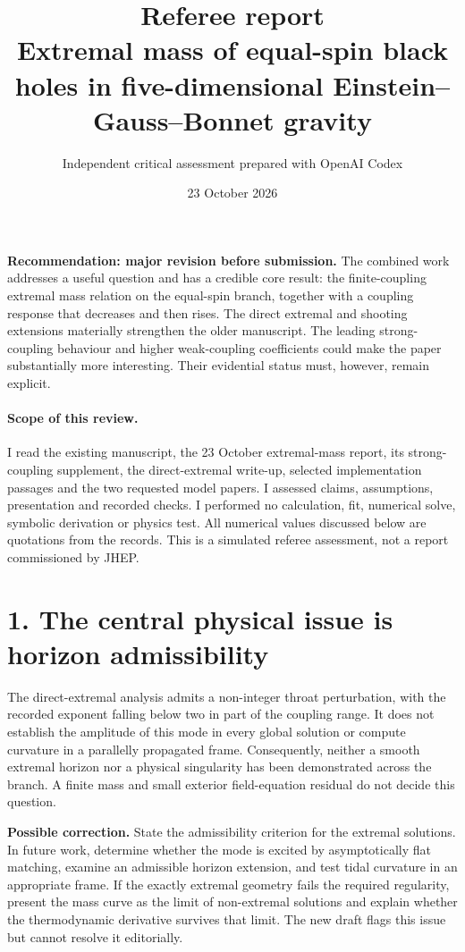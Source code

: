 \documentclass[11pt,a4paper]{article}
\title{Referee report\\\large Extremal mass of equal-spin black holes in five-dimensional Einstein--Gauss--Bonnet gravity}
\author{Independent critical assessment prepared with OpenAI Codex}
\date{23 October 2026}
\begin{document}
\maketitle
\noindent\textbf{Recommendation: major revision before submission.}
The combined work addresses a useful question and has a credible core result: the finite-coupling extremal mass relation on the equal-spin branch, together with a coupling response that decreases and then rises. The direct extremal and shooting extensions materially strengthen the older manuscript. The leading strong-coupling behaviour and higher weak-coupling coefficients could make the paper substantially more interesting. Their evidential status must, however, remain explicit.

\paragraph{Scope of this review.}
I read the existing manuscript, the 23 October extremal-mass report, its strong-coupling supplement, the direct-extremal write-up, selected implementation passages and the two requested model papers. I assessed claims, assumptions, presentation and recorded checks. I performed no calculation, fit, numerical solve, symbolic derivation or physics test. All numerical values discussed below are quotations from the records. This is a simulated referee assessment, not a report commissioned by JHEP.

\section*{1. The central physical issue is horizon admissibility}
The direct-extremal analysis admits a non-integer throat perturbation, with the recorded exponent falling below two in part of the coupling range. It does not establish the amplitude of this mode in every global solution or compute curvature in a parallelly propagated frame. Consequently, neither a smooth extremal horizon nor a physical singularity has been demonstrated across the branch. A finite mass and small exterior field-equation residual do not decide this question.

\textbf{Possible correction.} State the admissibility criterion for the extremal solutions. In future work, determine whether the mode is excited by asymptotically flat matching, examine an admissible horizon extension, and test tidal curvature in an appropriate frame. If the exactly extremal geometry fails the required regularity, present the mass curve as the limit of non-extremal solutions and explain whether the thermodynamic derivative survives that limit. The new draft flags this issue but cannot resolve it editorially.
\end{document}
